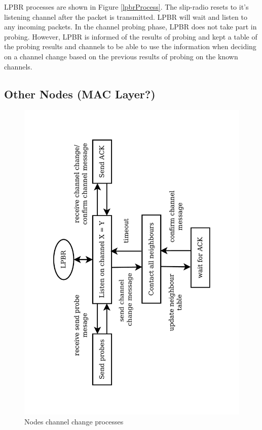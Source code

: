LPBR processes are shown in Figure \ref{lpbrProcess}.
The slip-radio resets to it's listening channel after the packet is transmitted. LPBR will wait and listen to any incoming packets. In the channel probing phase, LPBR does not take part in probing. However, LPBR is informed of the results of probing and kept a table of the probing results and channels to be able to use the information when deciding on a channel change based on the previous results of probing on the known channels.



\subsection{Other Nodes (MAC Layer?)}

\begin{figure}
\centering
\includegraphics[trim=2cm 2cm 2.5cm 2cm, clip=true, totalheight=0.58\textheight, angle=270]{otherNodes.pdf}
\caption{Nodes channel change processes}
\label{fig_otherNodes}
\end{figure}

